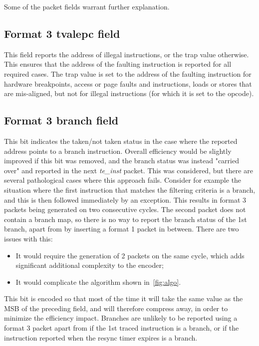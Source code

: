 Some of the packet fields warrant further explanation.

\subsection{Format 3 \textbf{tvalepc} field}

This field reports the address of illegal instructions, or the trap value otherwise.  This ensures that
the address of the faulting instruction is reported for all required cases.  The trap value 
is set to the address of the faulting instruction for hardware breakpoints, access or page faults and 
instructions, loads or stores that are mis-aligned, but not for illegal instructions (for which it is set to the opcode).

\subsection{Format 3 \textbf{branch} field}

This bit indicates the taken/not taken status in the case where the reported address points to a branch instruction.
Overall efficiency would be slightly improved if this bit was removed, and the branch status was instead 
"carried over" and reported in the next \textit{te\_inst} packet.  This was considered, but there are several
pathological cases where this approach fails.  Consider for example the situation where the first instruction
that matches the filtering criteria is a branch, and this is then followed immediately by an exception.  This
results in format 3 packets being generated on two consecutive cycles.  The second packet does not contain a branch
map, so there is no way to report the branch status of the 1st branch, apart from by inserting a format 1 packet in 
between.  There are two issues with this:

\begin{itemize}
  \item It would require the generation of 2 packets on the same cycle, which adds significant additional complexity
    to the encoder;
  \item It would complicate the algorithm shown in~\ref{fig:algo}. 
\end{itemize}

This bit is encoded so that most of the time it will take the same value as the MSB of the preceding field, and will
therefore compress away, in order to minimize the efficiency impact.  Branches are unlikely to be reported using a
format 3 packet apart from if the 1st traced instruction is a branch, or if the instruction reported when the 
resync timer expires is a branch.

